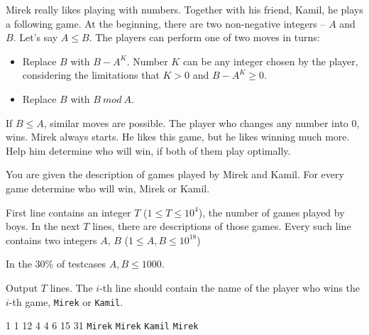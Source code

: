 

Mirek really likes playing with numbers. Together with his friend, Kamil, he plays a following game. At the beginning, there are two
non-negative integers -- $A$ and $B$. Let's say $A \leqslant B$. The players can perform one of two moves in turns:

\begin{itemize}
	\item Replace $B$ with $B - A^K$. Number $K$ can be any integer chosen by the player, considering the limitations that $K > 0$
	      and $B - A^K \ge 0$.
	\item Replace $B$ with $B\ mod\ A$. 
\end{itemize}

If $B \leqslant A$, similar moves are possible. The player who changes any number into $0$, wins. Mirek always starts. He likes this game, but he likes winning much more. Help him determine who will win, if both of them play optimally.


You are given the description of games played by Mirek and Kamil. For every game determine who will win, Mirek or Kamil.


First line contains an integer $T$ ($1 \le T \le 10^4$), the number of games played by boys.
In the next $T$ lines, there are descriptions of those games.
Every such line contains two integers $A$, $B$ ($1 \le A, B \le 10^{18}$) 
\smallskip

In the $30\%$ of testcases $A,B \le 1000$.


Output $T$ lines. The $i$-th line should contain the name of the player who wins the $i$-th game, \texttt{Mirek} or \texttt{Kamil}.


1 1
12 4
4 6
15 31
\sampleOUT
\texttt{Mirek}
\texttt{Mirek}
\texttt{Kamil}
\texttt{Mirek}
\sampleEND

